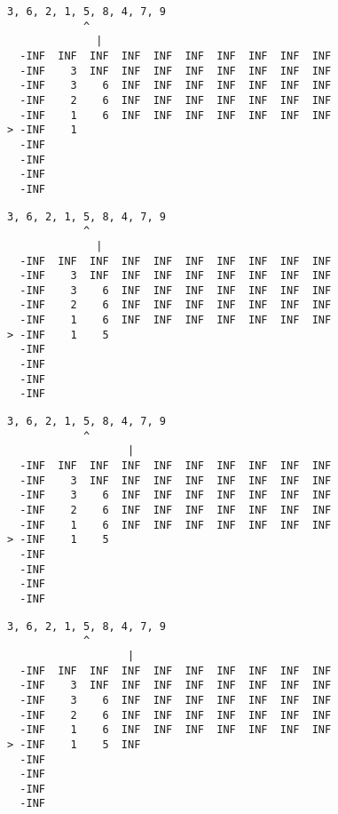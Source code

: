 { \begin{verbatim}
3, 6, 2, 1, 5, 8, 4, 7, 9
            ^
              |
  -INF  INF  INF  INF  INF  INF  INF  INF  INF  INF
  -INF    3  INF  INF  INF  INF  INF  INF  INF  INF
  -INF    3    6  INF  INF  INF  INF  INF  INF  INF
  -INF    2    6  INF  INF  INF  INF  INF  INF  INF
  -INF    1    6  INF  INF  INF  INF  INF  INF  INF
> -INF    1                                        
  -INF                                             
  -INF                                             
  -INF                                             
  -INF                                             
\end{verbatim} }

{ \begin{verbatim}
3, 6, 2, 1, 5, 8, 4, 7, 9
            ^
              |
  -INF  INF  INF  INF  INF  INF  INF  INF  INF  INF
  -INF    3  INF  INF  INF  INF  INF  INF  INF  INF
  -INF    3    6  INF  INF  INF  INF  INF  INF  INF
  -INF    2    6  INF  INF  INF  INF  INF  INF  INF
  -INF    1    6  INF  INF  INF  INF  INF  INF  INF
> -INF    1    5                                   
  -INF                                             
  -INF                                             
  -INF                                             
  -INF                                             
\end{verbatim} }

{ \begin{verbatim}
3, 6, 2, 1, 5, 8, 4, 7, 9
            ^
                   |
  -INF  INF  INF  INF  INF  INF  INF  INF  INF  INF
  -INF    3  INF  INF  INF  INF  INF  INF  INF  INF
  -INF    3    6  INF  INF  INF  INF  INF  INF  INF
  -INF    2    6  INF  INF  INF  INF  INF  INF  INF
  -INF    1    6  INF  INF  INF  INF  INF  INF  INF
> -INF    1    5                                   
  -INF                                             
  -INF                                             
  -INF                                             
  -INF                                             
\end{verbatim} }

{ \begin{verbatim}
3, 6, 2, 1, 5, 8, 4, 7, 9
            ^
                   |
  -INF  INF  INF  INF  INF  INF  INF  INF  INF  INF
  -INF    3  INF  INF  INF  INF  INF  INF  INF  INF
  -INF    3    6  INF  INF  INF  INF  INF  INF  INF
  -INF    2    6  INF  INF  INF  INF  INF  INF  INF
  -INF    1    6  INF  INF  INF  INF  INF  INF  INF
> -INF    1    5  INF                              
  -INF                                             
  -INF                                             
  -INF                                             
  -INF                                             
\end{verbatim} }

